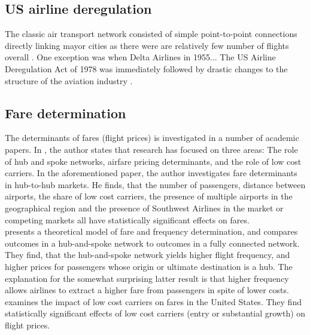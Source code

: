 \label{sec:background}

\subsection{US airline deregulation}
\label{subsec:b_deregulation}
The classic air transport network consisted of simple point-to-point connections directly linking mayor cities as there were are relatively few number of flights overall \cite{marti2015efficiency}. One exception was when Delta Airlines in 1955...
The US Airline Deregulation Act of 1978 was immediately followed by drastic changes to the structure of the aviation industry \citep{daraban2012low}. 

\subsection{Fare determination}
\label{subsec:b_fare}
The determinants of fares (flight prices) is investigated in a number of academic papers. In \citet{vowles2006airfare}, the author states that research has focused on three areas: The role of hub and spoke networks, airfare pricing determinants, and the role of low cost carriers. In the aforementioned paper, the author investigates fare determinants in hub-to-hub markets. He finds, that the number of passengers, distance between airports, the share of low cost carriers, the presence of multiple airports in the geographical region and the presence of Southwest Airlines in the market or competing markets all have statistically significant effects on fares.  \\
\citet{brueckner2001model} presents a theoretical model of fare and frequency determination, and compares outcomes in a hub-and-spoke network to outcomes in a fully connected network. They find, that the hub-and-spoke network yields higher flight frequency, and higher prices for passengers whose origin or ultimate destination is a hub. The explanation for the somewhat surprising latter result is that higher frequency allows airlines to extract a higher fare from passengers in spite of lower costs.  \\
\citet{abda2012impacts} examines the impact of low cost carriers on fares in the United States. They find statistically significant effects of low cost carriers (entry or substantial growth) on flight prices.  

